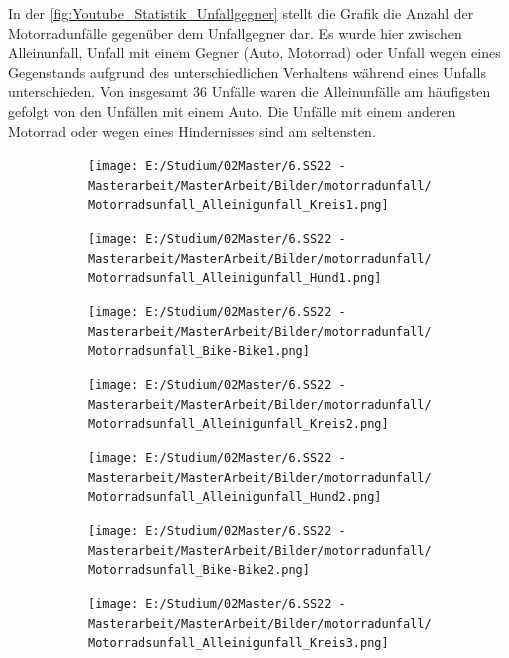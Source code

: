 In der \autoref{fig:Youtube_Statistik_Unfallgegner} stellt die Grafik die Anzahl der Motorradunfälle gegenüber dem Unfallgegner dar. Es wurde hier zwischen Alleinunfall, Unfall mit einem Gegner (Auto, Motorrad) oder Unfall wegen eines Gegenstands aufgrund des unterschiedlichen Verhaltens während eines Unfalls unterschieden. Von insgesamt 36 Unfälle waren die Alleinunfälle am häufigsten gefolgt von den Unfällen mit einem Auto. Die Unfälle mit einem anderen Motorrad oder wegen eines Hindernisses sind am seltensten.
\begin{figure}[htpb]
	\centering
	\begin{subfigure}{0.28\textwidth}
		\centering
		\texttt{[image: E:/Studium/02Master/6.SS22 - Masterarbeit/MasterArbeit/Bilder/motorradunfall/Motorradsunfall\_Alleinigunfall\_Kreis1.png]}
	\end{subfigure}
	\begin{subfigure}{0.28\textwidth}
		\centering
		\texttt{[image: E:/Studium/02Master/6.SS22 - Masterarbeit/MasterArbeit/Bilder/motorradunfall/Motorradsunfall\_Alleinigunfall\_Hund1.png]}
	\end{subfigure}
	\begin{subfigure}{0.28\textwidth}
		\centering
		\texttt{[image: E:/Studium/02Master/6.SS22 - Masterarbeit/MasterArbeit/Bilder/motorradunfall/Motorradsunfall\_Bike-Bike1.png]}
	\end{subfigure}
	\begin{subfigure}{0.28\textwidth}
		\centering
		\texttt{[image: E:/Studium/02Master/6.SS22 - Masterarbeit/MasterArbeit/Bilder/motorradunfall/Motorradsunfall\_Alleinigunfall\_Kreis2.png]}
	\end{subfigure}
	\begin{subfigure}{0.28\textwidth}
		\centering
		\texttt{[image: E:/Studium/02Master/6.SS22 - Masterarbeit/MasterArbeit/Bilder/motorradunfall/Motorradsunfall\_Alleinigunfall\_Hund2.png]}
	\end{subfigure}
	\begin{subfigure}{0.28\textwidth}
		\centering
		\texttt{[image: E:/Studium/02Master/6.SS22 - Masterarbeit/MasterArbeit/Bilder/motorradunfall/Motorradsunfall\_Bike-Bike2.png]}
	\end{subfigure}
	\begin{subfigure}{0.28\textwidth}
		\centering
		\texttt{[image: E:/Studium/02Master/6.SS22 - Masterarbeit/MasterArbeit/Bilder/motorradunfall/Motorradsunfall\_Alleinigunfall\_Kreis3.png]}
	\end{subfigure}
	\begin{subfigure}{0.28\textwidth}

\end{subfigure}
\end{figure}
